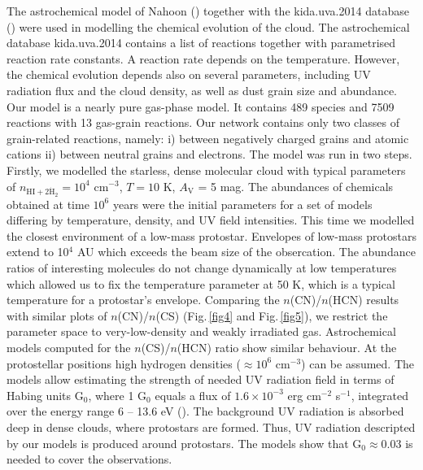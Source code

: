 \documentclass[a4paper]{article}
\begin{document}
\indent \indent The astrochemical model of Nahoon (\cite{wakelam2012}) together with the kida.uva.2014 database (\cite{wakelam2015}) were used in modelling the chemical evolution of the cloud. The astrochemical database kida.uva.2014 contains a list of reactions together with parametrised reaction rate constants. A reaction rate depends on the temperature. However, the chemical evolution depends also on several parameters, including UV radiation flux and the cloud density, as well as dust grain size and abundance. Our model is a nearly pure gas-phase model. It contains 489 species and 7509 reactions with 13 gas-grain reactions. Our network contains only two classes of grain-related reactions, namely: i) between negatively charged grains and atomic cations ii) between neutral grains and electrons. The model was run in two steps. Firstly, we modelled the starless, dense molecular cloud with typical parameters of $n_\mathrm{HI+2 \dot H_2} = 10^4$ cm$^{-3}$, $T = 10$ K, $A_\mathrm{V}$ = 5 mag. The abundances of chemicals obtained at time $10^6$ years were the initial parameters for a set of models differing by temperature, density, and UV field intensities. This time we modelled the closest environment of a low-mass protostar. Envelopes of low-mass protostars extend to 10$^4$ AU which exceeds the beam size of the obsercation. The abundance ratios of interesting molecules do not change dynamically at low temperatures which allowed us to fix the temperature parameter at 50 K, which is a typical temperature for a protostar's envelope. Comparing the $n$(CN)/$n$(HCN) results with similar plots of $n$(CN)/$n$(CS) (Fig.\,\ref{fig4} and Fig.\,\ref{fig5}), we restrict the parameter space to very-low-density and weakly irradiated gas. Astrochemical models computed for the $n$(CS)/$n$(HCN) ratio show similar behaviour. At the protostellar positions high hydrogen densities ($\approx 10^6$ cm$^{-3}$) can be assumed. The models allow estimating the strength of needed UV radiation field in terms of Habing units G$_0$, where 1 G$_0$ equals a flux of $1.6 \times 10^{-3}$ erg cm$^{-2}$ s$^{-1}$, integrated over the energy range 6 – 13.6 eV (\cite{habing1968}). The background UV radiation is absorbed deep in dense clouds, where protostars are formed. Thus, UV radiation descripted by our models is produced around protostars. The models show that G$_0 \approx 0.03$ is needed to cover the observations. 
\end{document}
